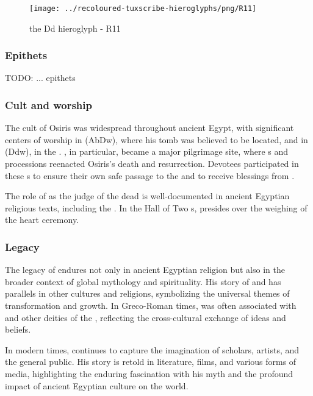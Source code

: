 \begin{figure} [H]
	\centering
	\texttt{[image: ../recoloured-tuxscribe-hieroglyphs/png/R11]}
	\caption{the Dd hieroglyph - R11}
\end{figure}

\subsubsection*{Epithets}

TODO: ... epithets

\subsubsection*{Cult and worship}

The cult of Osiris was widespread throughout ancient Egypt, with significant centers of worship in  (AbDw), where his tomb was believed to be located, and in  (Ddw), in the  . , in particular, became a major pilgrimage site, where s and processions reenacted Osiris's death and resurrection. Devotees participated in these s to ensure their own safe passage to the  and to receive blessings from .

The role of  as the judge of the dead is well-documented in ancient Egyptian religious texts, including the . In the Hall of Two s,  presides over the weighing of the heart ceremony.

\subsubsection*{Legacy}

The legacy of  endures not only in ancient Egyptian religion but also in the broader context of global mythology and spirituality. His story of  and  has parallels in other cultures and religions, symbolizing the universal themes of transformation and growth. In Greco-Roman times,  was often associated with  and other deities of the , reflecting the cross-cultural exchange of ideas and beliefs.

In modern times,  continues to capture the imagination of scholars, artists, and the general public. His story is retold in literature, films, and various forms of media, highlighting the enduring fascination with his myth and the profound impact of ancient Egyptian culture on the world.

